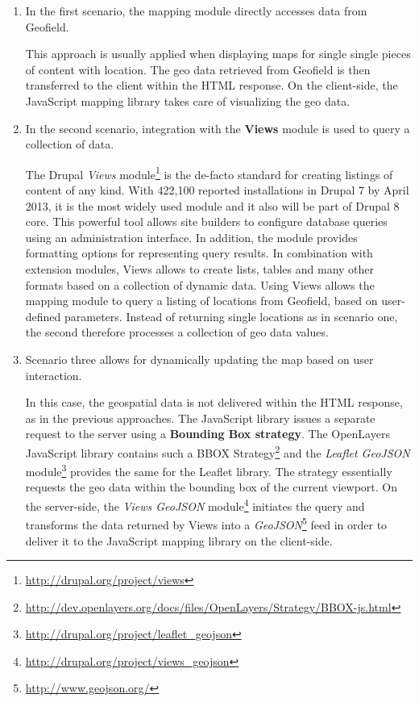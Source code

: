 \begin{enumerate}

\item In the first scenario, the mapping module directly accesses data from Geofield.

This approach is usually applied when displaying maps for single single pieces of content with location. The geo data retrieved from Geofield is then transferred to the client within the HTML response. On the client-side, the JavaScript mapping library takes care of visualizing the geo data.

\item In the second scenario, integration with the \textbf{Views} module is used to query a collection of data.

The Drupal \textit{Views} module\footnote{\url{http://drupal.org/project/views}} is the de-facto standard for creating listings of content of any kind. With 422,100 reported installations in Drupal 7 by April 2013, it is the most widely used module and it also will be part of Drupal 8 core. This powerful tool allows site builders to configure database queries using an administration interface. In addition, the module provides formatting options for representing query results. In combination with extension modules, Views allows to create lists, tables and many other formats based on a collection of dynamic data. Using Views allows the mapping module to query a listing of locations from Geofield, based on user-defined parameters. Instead of returning single locations as in scenario one, the second therefore processes a collection of geo data values.

\item Scenario three allows for dynamically updating the map based on user interaction.

In this case, the geospatial data is not delivered within the HTML response, as in the previous approaches. The JavaScript library issues a separate request to the server using a \textbf{Bounding Box strategy}. The OpenLayers JavaScript library contains such a BBOX Strategy\footnote{\url{http://dev.openlayers.org/docs/files/OpenLayers/Strategy/BBOX-js.html}} and the \textit{Leaflet GeoJSON} module\footnote{\url{http://drupal.org/project/leaflet_geojson}} provides the same for the Leaflet library. The strategy essentially requests the geo data within the bounding box of the current viewport. On the server-side, the \textit{Views GeoJSON} module\footnote{\url{http://drupal.org/project/views_geojson}} initiates the query and transforms the data returned by Views into a \textit{GeoJSON}\footnote{\url{http://www.geojson.org/}} feed in order to deliver it to the JavaScript mapping library on the client-side.

\end{enumerate}

